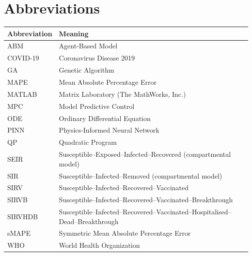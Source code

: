 \bigskip
\section*{Abbreviations}

\begin{tabular}{@{}ll@{}}
\toprule
\textbf{Abbreviation} & \textbf{Meaning} \\
\midrule
ABM       & Agent-Based Model \\
COVID-19  & Coronavirus Disease 2019 \\
GA        & Genetic Algorithm \\
MAPE      & Mean Absolute Percentage Error \\
MATLAB    & Matrix Laboratory (The MathWorks, Inc.) \\
MPC       & Model Predictive Control \\
ODE       & Ordinary Differential Equation \\
PINN      & Physics-Informed Neural Network \\
QP        & Quadratic Program \\
SEIR      & Susceptible--Exposed--Infected--Recovered (compartmental model) \\
SIR       & Susceptible--Infected--Removed (compartmental model) \\
SIRV      & Susceptible--Infected--Recovered--Vaccinated \\
SIRVB     & Susceptible--Infected--Recovered--Vaccinated--Breakthrough \\
SIRVHDB   & Susceptible--Infected--Recovered--Vaccinated--Hospitalised--Dead--Breakthrough \\
sMAPE     & Symmetric Mean Absolute Percentage Error \\
WHO       & World Health Organization \\
\bottomrule
\end{tabular}
